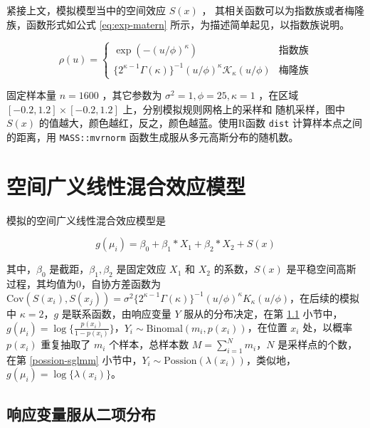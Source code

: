 \documentclass[12pt,a4paper,UTF8,twoside]{book}
\theoremstyle{definition}
\theoremstyle{definition}
\theoremstyle{definition}
\theoremstyle{remark}
\begin{document}
紧接上文，模拟模型当中的空间效应 \(S(x)\) ，
其相关函数可以为指数族或者梅隆族，函数形式如公式 \eqref{eq:exp-matern}
所示，为描述简单起见，以指数族说明。

\begin{equation}
\rho(u) =
\begin{cases}
\exp(-(u/\phi)^{\kappa}) & \text{指数族}\\
\{2^{\kappa -1}\Gamma(\kappa)\}^{-1}(u/\phi)^{\kappa}\mathcal{K}_{\kappa}(u/\phi) & \text{梅隆族}
\end{cases} \label{eq:exp-matern}
\end{equation}

\noindent 固定样本量 \(n=1600\) ，其它参数为
\(\sigma^2=1,\phi=25,\kappa=1\) ，在区域 \([-0.2,1.2]\times [-0.2,1.2]\)
上，分别模拟规则网格上的采样和 随机采样，图中 \(S(x)\)
的值越大，颜色越红，反之，颜色越蓝。使用R函数 \texttt{dist}
计算样本点之间的距离，用 \texttt{MASS::mvrnorm}
函数生成服从多元高斯分布的随机数。

\hypertarget{sim-sglmm}{%
\section{空间广义线性混合效应模型}\label{sim-sglmm}}

模拟的空间广义线性混合效应模型是

\begin{equation}
g(\mu_i) = \beta_{0} + \beta_{1} * X_{1} + \beta_{2} * X_{2} + S(x) \label{eq:sim-SGLMM}
\end{equation}

\noindent 其中，\(\beta_0\) 是截距，\(\beta_{1},\beta_{2}\) 是固定效应
\(X_{1}\) 和 \(X_{2}\) 的系数，\(S(x)\)
是平稳空间高斯过程，其均值为0，自协方差函数为
\(\mathrm{Cov}(S(x_i),S(x_j)) = \sigma^2 \big\{2^{\kappa-1}\Gamma(\kappa)\big\}^{-1}(u/\phi)^{\kappa}K_{\kappa}(u/\phi)\)，在后续的模拟中
\(\kappa = 2\)，\(g\) 是联系函数，由响应变量 \(Y\) 服从的分布决定，在第
\ref{binomal-sglmm}
小节中，\(g(\mu_i) = \log\{\frac{p(x_i)}{1-p(x_i)}\}\)，\(Y_{i} \sim \mathrm{Binomal}(m_{i},p(x_{i}))\)，在位置
\(x_i\) 处，以概率 \(p(x_i)\) 重复抽取了 \(m_i\) 个样本，总样本数
\(M=\sum_{i=1}^{N}m_i\)，\(N\) 是采样点的个数，在第 \ref{possion-sglmm}
小节中，\(Y_i \sim \mathrm{Possion}(\lambda(x_{i}))\)，类似地，\(g(\mu_i) = \log\{\lambda(x_{i})\}\)。

\hypertarget{binomal-sglmm}{%
\subsection{响应变量服从二项分布}\label{binomal-sglmm}}
\end{document}
